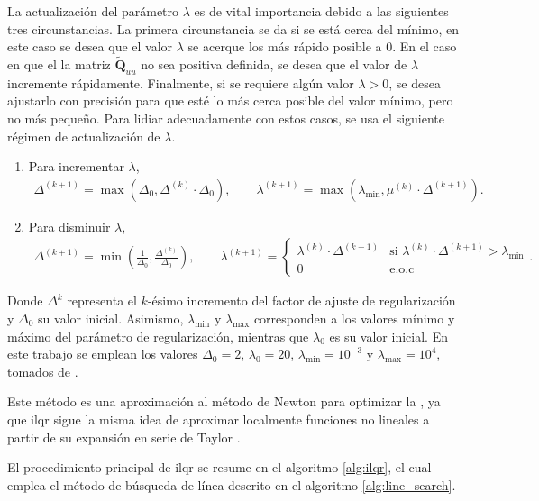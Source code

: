 La actualización del parámetro $\lambda$ es de vital importancia debido a las siguientes tres circunstancias. La primera circunstancia se da si se está cerca del mínimo, en este caso se desea que el valor $\lambda$ se acerque los más rápido posible a $0$. En el caso en que el la matriz $\tilde{\mathbf{Q}}_{uu}$ no sea positiva definida, se desea que el valor de $\lambda$ incremente rápidamente. Finalmente, si se requiere algún valor $\lambda > 0$, se desea ajustarlo con precisión para que esté lo más cerca posible del valor mínimo, pero no más pequeño. Para lidiar adecuadamente con estos casos, se usa el siguiente régimen de actualización de $\lambda$. \cite{Tassa2012}
\begin{enumerate}
    \item Para incrementar $\lambda$,
    \begin{align}
        \Delta^{(k +1)} = \max(\Delta_0, \Delta^{(k)}\cdot \Delta_0), \qquad \lambda^{(k+1)} = \max(\lambda_{\min}, \mu^{(k)}\cdot\Delta^{(k+1)}).
        \label{eq:lamb_increase}
    \end{align}
    \item Para disminuir $\lambda$,
    \begin{align}
         \Delta^{(k+1)} = \min\left(
    \frac{1}{\Delta_0}, \frac{\Delta^{(k)}}{\Delta_0}
    \right),
    \qquad
        \lambda^{(k+1)} = 
    \begin{cases}
        \lambda^{(k)} \cdot \Delta^{(k+1)} &\text{si } \lambda^{(k)} \cdot \Delta^{(k+1)} > \lambda_{\min} \\
        0 &\text{e.o.c}
    \end{cases}.
    \label{eq:lamb_decrease}
    \end{align}
\end{enumerate}
Donde $\Delta^{k}$ representa el $k$-ésimo incremento del factor de ajuste de regularización y $\Delta_{0}$ su valor inicial. Asimismo, $\lambda_{\min}$ y $\lambda_{\max}$ corresponden a los valores mínimo y máximo del parámetro de regularización, mientras que $\lambda_0$ es su valor inicial. En este trabajo se emplean los valores $\Delta_{0}=2$, $\lambda_0=20$, $\lambda_{\min}=10^{-3}$ y $\lambda_{\max}=10^4$, tomados de \cite{Tassa2012}.

Este método es una aproximación al método de Newton para optimizar la , ya que \acrshort{ilqr} sigue la misma idea de aproximar localmente funciones no lineales a partir de su expansión en serie de Taylor \cite{levine2017}.

El procedimiento principal de \acrshort{ilqr} se resume en el algoritmo \ref{alg:ilqr}, el cual emplea el método de búsqueda de línea descrito en el algoritmo \ref{alg:line_search}.


